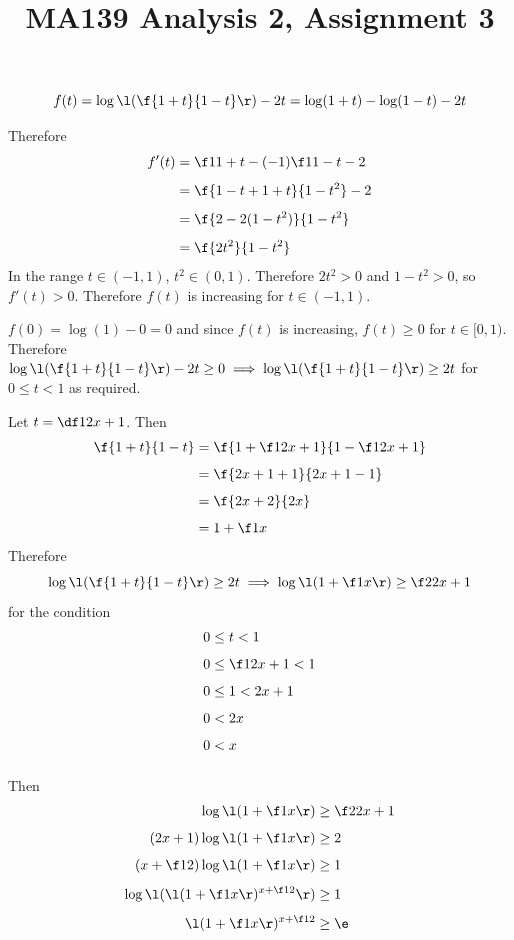 \documentclass[a4paper]{article}
\title{MA139 Analysis 2, Assignment 3}
\begin{document}
\maketitle

\setlength{\parindent}{0em}
\setlength{\parskip}{1em}


$$f(t) = \log\l( \f{1+t}{1-t} \r) - 2t = \log(1+t) - \log(1-t) - 2t$$

Therefore \begin{align*}
f'(t) &= \f1{1+t} - (-1)\f1{1-t} - 2\\[1ex]
&= \f{1-t + 1+t}{1-t^2} - 2\\[1ex]
&= \f{2 - 2(1-t^2)}{1-t^2}\\[1ex]
&= \f{2t^2}{1-t^2}
\end{align*}
In the range $t \in (-1, 1)$, $t^2 \in (0, 1)$. Therefore $2t^2 > 0$ and $1 - t^2 > 0$, so $f'(t) > 0$. Therefore $f(t)$ is increasing for $t \in (-1, 1)$.

$f(0) = \log(1) - 0 = 0$ and since $f(t)$ is increasing, $f(t) \ge 0$ for $t \in [0, 1)$. Therefore $\log\l( \f{1+t}{1-t} \r) - 2t \ge 0 \implies \log\l( \f{1+t}{1-t} \r) \ge 2t$ for $0 \le t < 1$ as required.

Let $t = \df1{2x+1}$. Then \begin{align*}
\f{1+t}{1-t} &= \f{1 + \f1{2x+1}}{1 - \f1{2x+1}}\\[1ex]
&= \f{2x + 1 + 1}{2x + 1 - 1}\\[1ex]
&= \f{2x + 2}{2x}\\[1ex]
&= 1 + \f1x
\end{align*}
Therefore $$\log\l( \f{1+t}{1-t} \r) \ge 2t \implies \log\l( 1 + \f1x \r) \ge \f2{2x+1}$$
for the condition \begin{align*}
0 &\le t < 1\\[1ex]
0 &\le \f1{2x+1} < 1\\[1ex]
0 &\le 1 < 2x + 1\\[1ex]
0 &< 2x\\[1ex]
0 &< x\\[1ex]
\end{align*}

Then \begin{align*}
\log\l( 1 + \f1x \r) &\ge \f2{2x+1}\\[1ex]
(2x+1) \log\l( 1 + \f1x \r) &\ge 2\\[1ex]
(x + \f12) \log\l( 1 + \f1x \r) &\ge 1\\[1ex]
\log\l( \l( 1 + \f1x \r)^{x + \f12} \r) &\ge 1\\[1ex]
\l( 1 + \f1x \r)^{x + \f12} &\ge \e\\[1ex]
\end{align*}
\end{document}
